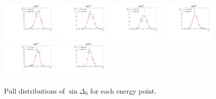 \begin{figure}[h]
    \includegraphics[width=0.24\textwidth]{figure/io_full_sim/polarization/pull_polarization_delta0_4740.pdf}
    \includegraphics[width=0.24\textwidth]{figure/io_full_sim/polarization/pull_polarization_delta0_4750.pdf}
    \includegraphics[width=0.24\textwidth]{figure/io_full_sim/polarization/pull_polarization_delta0_4780.pdf}
    \includegraphics[width=0.24\textwidth]{figure/io_full_sim/polarization/pull_polarization_delta0_4840.pdf}
    \includegraphics[width=0.24\textwidth]{figure/io_full_sim/polarization/pull_polarization_delta0_4914.pdf}
    \includegraphics[width=0.24\textwidth]{figure/io_full_sim/polarization/pull_polarization_delta0_4946.pdf}
    \caption{Pull distributions of $\sin\Delta_0$ for each energy point.}
\label{fig:io_wo_bkg_pull_delta0}
\end{figure}

